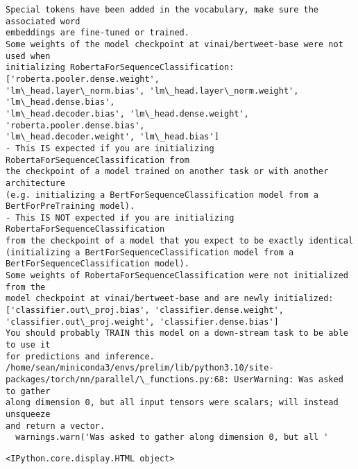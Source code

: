 \documentclass[11pt]{article}
\begin{document}
    \begin{Verbatim}[commandchars=\\\{\}]
Special tokens have been added in the vocabulary, make sure the associated word
embeddings are fine-tuned or trained.
Some weights of the model checkpoint at vinai/bertweet-base were not used when
initializing RobertaForSequenceClassification: ['roberta.pooler.dense.weight',
'lm\_head.layer\_norm.bias', 'lm\_head.layer\_norm.weight', 'lm\_head.dense.bias',
'lm\_head.decoder.bias', 'lm\_head.dense.weight', 'roberta.pooler.dense.bias',
'lm\_head.decoder.weight', 'lm\_head.bias']
- This IS expected if you are initializing RobertaForSequenceClassification from
the checkpoint of a model trained on another task or with another architecture
(e.g. initializing a BertForSequenceClassification model from a
BertForPreTraining model).
- This IS NOT expected if you are initializing RobertaForSequenceClassification
from the checkpoint of a model that you expect to be exactly identical
(initializing a BertForSequenceClassification model from a
BertForSequenceClassification model).
Some weights of RobertaForSequenceClassification were not initialized from the
model checkpoint at vinai/bertweet-base and are newly initialized:
['classifier.out\_proj.bias', 'classifier.dense.weight',
'classifier.out\_proj.weight', 'classifier.dense.bias']
You should probably TRAIN this model on a down-stream task to be able to use it
for predictions and inference.
/home/sean/miniconda3/envs/prelim/lib/python3.10/site-
packages/torch/nn/parallel/\_functions.py:68: UserWarning: Was asked to gather
along dimension 0, but all input tensors were scalars; will instead unsqueeze
and return a vector.
  warnings.warn('Was asked to gather along dimension 0, but all '
    \end{Verbatim}

    
    \begin{Verbatim}[commandchars=\\\{\}]
<IPython.core.display.HTML object>
    \end{Verbatim}
\end{document}
